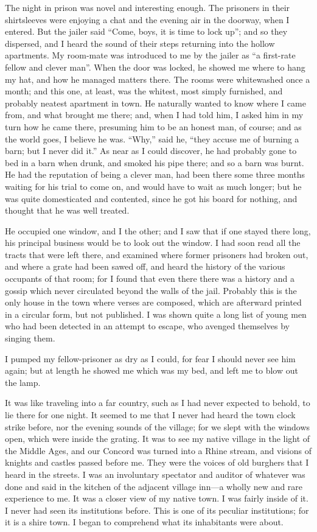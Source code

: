 \documentclass[letterpaper,12pt]{article}
\begin{document}
The night in prison was novel and interesting enough. The prisoners in their
shirtsleeves were enjoying a chat and the evening air in the doorway, when
I entered. But the jailer said \enquote{Come, boys, it is time to lock up}; and
so they dispersed, and I heard the sound of their steps returning into the
hollow apartments.  My room-mate was introduced to me by the jailer as
\enquote{a first-rate fellow and clever man}. When the door was locked, he
showed me where to hang my hat, and how he managed matters there. The rooms were
whitewashed once a month; and this one, at least, was the whitest, most simply
furnished, and probably neatest apartment in town.  He naturally wanted to know
where I came from, and what brought me there; and, when I had told him, I asked
him in my turn how he came there, presuming him to be an honest man, of course;
and as the world goes, I believe he was. \enquote{Why,} said he, \enquote{they
    accuse me of burning a barn; but I never did it.} As near as I could
discover, he had probably gone to bed in a barn when drunk, and smoked his pipe
there; and so a barn was burnt. He had the reputation of being a clever man, had
been there some three months waiting for his trial to come on, and would have to
wait as much longer; but he was quite domesticated and contented, since he got
his board for nothing, and thought that he was well treated.

He occupied one window, and I the other; and I saw that if one stayed there
long, his principal business would be to look out the window. I had soon read
all the tracts that were left there, and examined where former prisoners had
broken out, and where a grate had been sawed off, and heard the history of the
various occupants of that room; for I found that even there there was a history
and a gossip which never circulated beyond the walls of the jail. Probably this
is the only house in the town where verses are composed, which are afterward
printed in a circular form, but not published. I was shown quite a long list of
young men who had been detected in an attempt to escape, who avenged themselves
by singing them.

I pumped my fellow-prisoner as dry as I could, for fear I should never see him
again; but at length he showed me which was my bed, and left me to blow out the
lamp.

It was like traveling into a far country, such as I had never expected to
behold, to lie there for one night. It seemed to me that I never had heard the
town clock strike before, nor the evening sounds of the village; for we slept
with the windows open, which were inside the grating. It was to see my native
village in the light of the Middle Ages, and our Concord was turned into a Rhine
stream, and visions of knights and castles passed before me. They were the
voices of old burghers that I heard in the streets. I was an involuntary
spectator and auditor of whatever was done and said in the kitchen of the
adjacent village inn---a wholly new and rare experience to me. It was a closer
view of my native town. I was fairly inside of it. I never had seen its
institutions before. This is one of its peculiar institutions; for it is a shire
town. I began to comprehend what its inhabitants were about.
\end{document}
